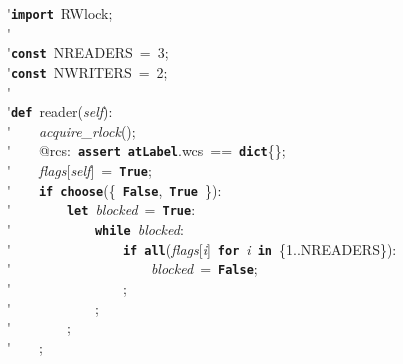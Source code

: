 \'\>\texttt{\textbf{import}}~RWlock;\\

\'\>\\

\'\>\texttt{\textbf{const}}~NREADERS~=~3;\\

\'\>\texttt{\textbf{const}}~NWRITERS~=~2;\\

\'\>\\

\'\>\texttt{\textbf{def}}~reader(\textit{self}):\\

\'\>~~~~\textit{acquire\_rlock}();\\

\'\>~~~~@rcs:~\texttt{\textbf{assert}}~\texttt{\textbf{atLabel}}.wcs~==~\texttt{\textbf{dict}}\{\};\\

\'\>~~~~\textit{flags}[\textit{self}]~=~\texttt{\textbf{True}};\\

\'\>~~~~\texttt{\textbf{if}}~\texttt{\textbf{choose}}(\{~\texttt{\textbf{False}},~\texttt{\textbf{True}}~\}):\\

\'\>~~~~~~~~\texttt{\textbf{let}}~\textit{blocked}~=~\texttt{\textbf{True}}:\\

\'\>~~~~~~~~~~~~\texttt{\textbf{while}}~\textit{blocked}:\\

\'\>~~~~~~~~~~~~~~~~\texttt{\textbf{if}}~\texttt{\textbf{all}}(\textit{flags}[\textit{i}]~\texttt{\textbf{for}}~\textit{i}~\texttt{\textbf{in}}~\{1..NREADERS\}):\\

\'\>~~~~~~~~~~~~~~~~~~~~\textit{blocked}~=~\texttt{\textbf{False}};\\

\'\>~~~~~~~~~~~~~~~~;\\

\'\>~~~~~~~~~~~~;\\

\'\>~~~~~~~~;\\

\'\>~~~~;\\

